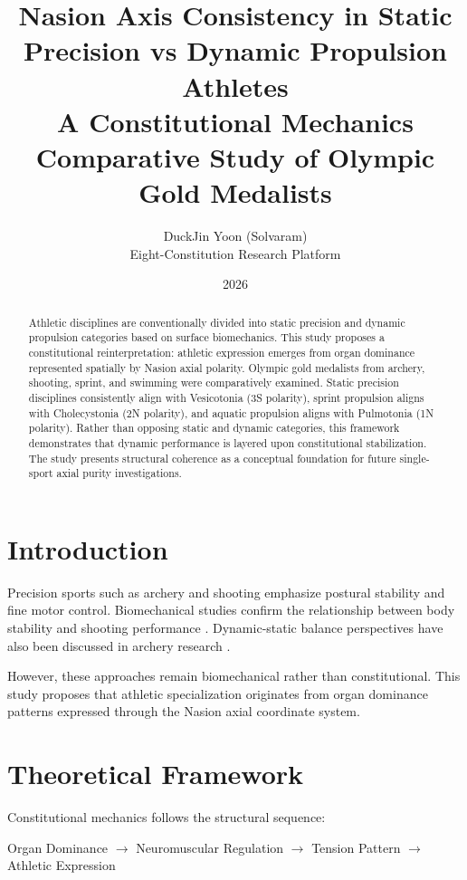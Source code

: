 \documentclass[12pt]{article}
\title{
Nasion Axis Consistency in Static Precision vs Dynamic Propulsion Athletes\\
\large A Constitutional Mechanics Comparative Study of Olympic Gold Medalists
}
\author{
DuckJin Yoon (Solvaram)\\
Eight-Constitution Research Platform
}
\date{2026}
\begin{document}
\maketitle

\begin{abstract}
Athletic disciplines are conventionally divided into static precision and dynamic propulsion categories based on surface biomechanics. 
This study proposes a constitutional reinterpretation: athletic expression emerges from organ dominance represented spatially by Nasion axial polarity. 
Olympic gold medalists from archery, shooting, sprint, and swimming were comparatively examined. 
Static precision disciplines consistently align with Vesicotonia (3S polarity), sprint propulsion aligns with Cholecystonia (2N polarity), and aquatic propulsion aligns with Pulmotonia (1N polarity). 
Rather than opposing static and dynamic categories, this framework demonstrates that dynamic performance is layered upon constitutional stabilization. 
The study presents structural coherence as a conceptual foundation for future single-sport axial purity investigations.
\end{abstract}

\section{Introduction}

Precision sports such as archery and shooting emphasize postural stability and fine motor control. 
Biomechanical studies confirm the relationship between body stability and shooting performance \cite{santos2025_archery_stability,fan2025_archery_postural}. 
Dynamic-static balance perspectives have also been discussed in archery research \cite{kesilmis2024_archery_balance}.
 

However, these approaches remain biomechanical rather than constitutional. 
This study proposes that athletic specialization originates from organ dominance patterns expressed through the Nasion axial coordinate system.

\section{Theoretical Framework}

Constitutional mechanics follows the structural sequence:

\begin{center}
Organ Dominance $\rightarrow$ Neuromuscular Regulation $\rightarrow$ Tension Pattern $\rightarrow$ Athletic Expression
\end{center}
\end{document}
